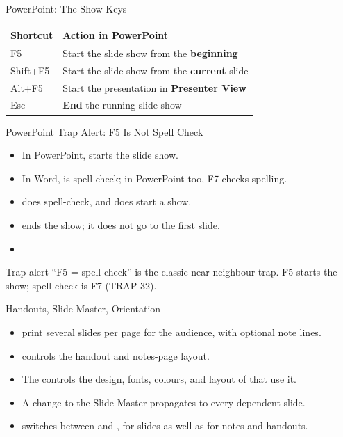\documentclass[aspectratio=169]{beamer}
\begin{document}
\begin{frame}{PowerPoint: The Show Keys}
  \begin{center}
    \begin{tabular}{p{}p{}}
      \toprule
      \textbf{Shortcut} & \textbf{Action in PowerPoint} \\
      \midrule
      F5 & Start the slide show from the \textbf{beginning} \\
      Shift+F5 & Start the slide show from the \textbf{current} slide \\
      Alt+F5 & Start the presentation in \textbf{Presenter View} \\
      Esc & \textbf{End} the running slide show \\
      \bottomrule
    \end{tabular}
  \end{center}
  \vspace{0.25cm}
\end{frame}

\begin{frame}{PowerPoint Trap Alert: F5 Is Not Spell Check}
  \begin{itemize}
    \item In PowerPoint,  starts the slide show.
    \item In Word,  is spell check; in PowerPoint too, F7 checks
      spelling.
    \item {} does  spell-check, and  does 
      start a show.
    \item {} ends the show; it does not go to the first slide.
    \item {}
  \end{itemize}
  \begin{alertblock}{Trap alert}
    ``F5 = spell check'' is the classic near-neighbour trap. F5 starts the
    show; spell check is F7 (TRAP-32).
  \end{alertblock}
\end{frame}

\begin{frame}{Handouts, Slide Master, Orientation}
  \begin{itemize}
    \item {} print several slides per page for the audience, with
      optional note lines.
    \item {} controls the handout and notes-page layout.
    \item The  controls the design, fonts, colours, and
      layout of  that use it.
    \item A change to the Slide Master propagates to every dependent slide.
    \item {} switches between  and
      , for slides as well as for notes and handouts.
  \end{itemize}
\end{frame}
\end{document}
